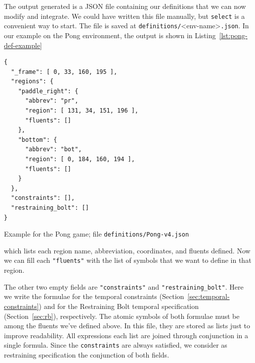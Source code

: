 The output generated is a JSON file containing our definitions that we can now
modify and integrate. We could have written this file manually, but
\texttt{select} is a convenient way to start. The file is saved at
\texttt{definitions/}<env-name>\texttt{.json}. In our example on the Pong
environment, the output is shown in Listing~\ref{lst:pong-def-example}
\begin{listing}
\begin{verbatim}
{
  "_frame": [ 0, 33, 160, 195 ],
  "regions": {
    "paddle_right": {
      "abbrev": "pr",
      "region": [ 131, 34, 151, 196 ],
      "fluents": []
    },
    "bottom": {
      "abbrev": "bot",
      "region": [ 0, 184, 160, 194 ],
      "fluents": []
    }
  },
  "constraints": [],
  "restraining_bolt": []
}
\end{verbatim}
\caption{Example for the Pong game; file \texttt{definitions/Pong-v4.json}}
\label{lst:pong-def-example}
\end{listing}
which lists each region name, abbreviation, coordinates, and fluents defined.
Now we can fill each \verb|"fluents"| with the list of symbols that we want to
define in that region.

The other two empty fields are \verb|"constraints"| and
\verb|"restraining_bolt"|. Here we write the \ldl{} formulae for the temporal
constraints (Section~\ref{sec:temporal-constraints}) and for the Restraining
Bolt temporal specification (Section~\ref{sec:rb}), respectively. The atomic
symbols of both formulae must be among the fluents we've defined above. In
this file, they are stored as lists just to improve readability. All
expressions each list are joined through conjunction in a single \ldl{}
formula. Since the \texttt{constraints} are always satisfied, we consider as
restraining specification the conjunction of both fields.


